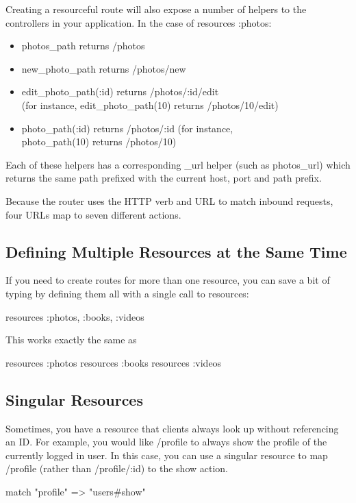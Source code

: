 \documentclass[10pt]{book}
\newenvironment{code}{%
  \scriptsize
    \verbatim
}{%
    \endverbatim
    \newline
}
\begin{document}
Creating a resourceful route will also expose a number of helpers to the controllers in your application. In the case of resources :photos:
\begin{itemize}
	\item photos\_path returns /photos
	\item new\_photo\_path returns /photos/new
	\item edit\_photo\_path(:id) returns /photos/:id/edit \\ (for instance, edit\_photo\_path(10) returns /photos/10/edit)
	\item photo\_path(:id) returns /photos/:id (for instance, \\ photo\_path(10) returns /photos/10)
\end{itemize}

Each of these helpers has a corresponding \_url helper (such as photos\_url) which returns the same path prefixed with the current host, port and path prefix.

Because the router uses the HTTP verb and URL to match inbound requests, four URLs map to seven different actions.

\subsection{ Defining Multiple Resources at the Same Time}

If you need to create routes for more than one resource, you can save  a bit of typing by defining them all with a single call to resources:
\begin{code}
resources :photos, :books, :videos
\end{code}

This works exactly the same as
\begin{code}
resources :photos
resources :books
resources :videos
\end{code}

\subsection{ Singular Resources}

Sometimes, you have a resource that clients always look up without referencing an ID. For example, you would like /profile to always show the profile of the currently logged in user. In this case, you can use a singular resource to map /profile (rather than /profile/:id) to the show action.
\begin{code}
match "profile" => "users#show"
\end{code}
\end{document}
